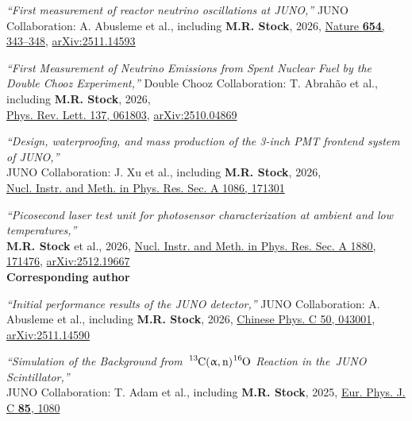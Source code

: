 \documentclass[letterpaper,12pt, oneside]{article}
\begin{document}
\begin{etaremune}[leftmargin=1.65em]
\item \textit{“First measurement of reactor neutrino oscillations at JUNO,”} JUNO Collaboration: A. Abusleme et al., including \textbf{M.R. Stock}, 2026, \href{https://doi.org/10.1038/s41586-026-10538-z}{Nature \textbf{654}, 343–348}, 
\href{https://doi.org/10.48550/arXiv.2511.14593}{arXiv:2511.14593}

\item \textit{“First Measurement of Neutrino Emissions from Spent Nuclear Fuel by the Double Chooz Experiment,”} Double Chooz Collaboration: T. Abrah\~ao et al., including \textbf{M.R. Stock}, 2026, \\ \href{https://doi.org/10.1103/dr26-j19g}{Phys. Rev. Lett. 137, 061803},  \href{https://doi.org/10.48550/arXiv.2510.04869}{arXiv:2510.04869}

\item \textit{“Design, waterproofing, and mass production of the 3-inch PMT frontend system of JUNO,”} \\ JUNO Collaboration: J. Xu et al., including \textbf{M.R. Stock}, 2026, \\ \href{https://doi.org/10.1016/j.nima.2026.171301}{Nucl. Instr. and Meth. in Phys. Res. Sec. A 1086, 171301}
		
\item \textit{“Picosecond laser test unit for photosensor characterization at ambient and low temperatures,”}\\\textbf{M.R. Stock} et al., 2026, \href{https://doi.org/10.1016/j.nima.2026.171476}{Nucl. Instr. and Meth. in Phys. Res. Sec. A 1880, 171476}, \href{https://doi.org/10.48550/arXiv.2512.19667}{arXiv:2512.19667}
\\
\textbf{Corresponding author}

\item \textit{“Initial performance results of the JUNO detector,”} JUNO Collaboration: A. Abusleme et al., including \textbf{M.R. Stock}, 2026,  \href{https://doi.org/10.1088/1674-1137/ae3dc1}{Chinese Phys. C 50, 043001}, 
\href{https://doi.org/10.48550/arXiv.2511.14590}{arXiv:2511.14590}

\item \textit{“Simulation of the Background from~$\ce{^{13}C}(\upalpha, \ce{n}) \ce{^{16}O}$ Reaction in the~JUNO Scintillator,”} \\ JUNO Collaboration: T. Adam et al., including \textbf{M.R. Stock}, 2025, \href{https://doi.org/10.1140/epjc/s10052-025-14333-4}{Eur. Phys. J. C \textbf{85}, 1080}


\end{etaremune}
\end{document}
